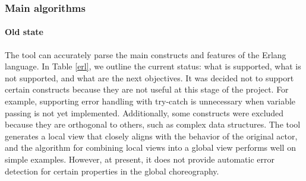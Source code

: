 \subsubsection{Main algorithms}


\paragraph{Old state}

The tool can accurately parse the main constructs and features of the Erlang 
language. In Table \ref{erl}, we outline the current status: what is supported, 
what is not supported, and what are the next objectives. It was decided not to 
support certain constructs because they are not useful at this stage of the 
project. For example, supporting error handling with try-catch is unnecessary 
when variable passing is not yet implemented. Additionally, some constructs were
excluded because they are orthogonal to others, such as complex data structures. 
The tool generates a local view that closely aligns with the behavior of the 
original actor, and the algorithm for combining local views into a global view
performs well on simple examples. However, at present, it does not provide 
automatic error detection for certain properties in the global choreography.

